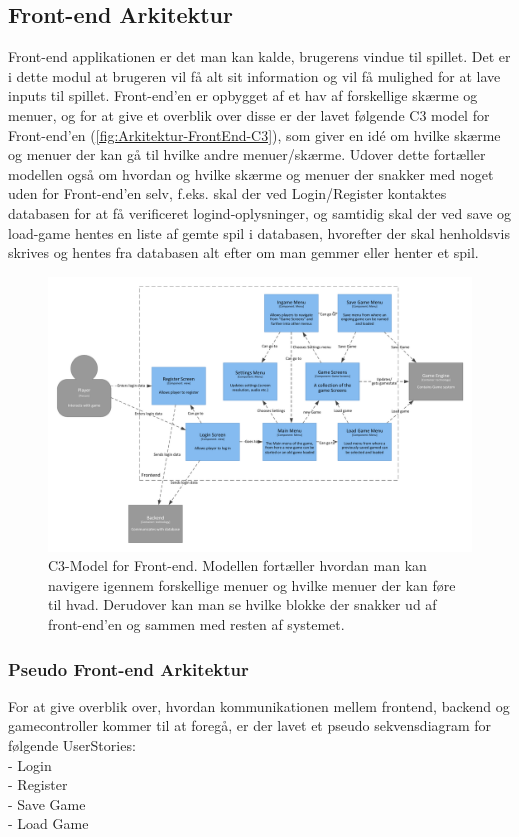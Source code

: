 \subsection{Front-end Arkitektur}

Front-end applikationen er det man kan kalde, brugerens vindue til spillet. Det er i dette modul at brugeren vil få alt sit information
og vil få mulighed for at lave inputs til spillet. 
Front-end'en er opbygget af et hav af forskellige skærme og menuer, og for at give et overblik over disse er der lavet følgende C3 model
for Front-end'en (\autoref{fig:Arkitektur-FrontEnd-C3}), som giver en idé om hvilke skærme og menuer der kan gå til hvilke andre menuer/skærme.
Udover dette fortæller modellen også om hvordan og hvilke skærme og menuer der snakker med noget uden for Front-end'en selv, f.eks. skal der
ved Login/Register kontaktes databasen for at få verificeret logind-oplysninger, og samtidig skal der ved save og load-game hentes en liste af
gemte spil i databasen, hvorefter der skal henholdsvis skrives og hentes fra databasen alt efter om man gemmer eller henter et spil.

\begin{figure}[H]
\centering
\includegraphics[width = \textwidth]{02-Body/Images/Frontend_C3.pdf}
\caption{C3-Model for Front-end. Modellen fortæller hvordan man kan navigere igennem forskellige menuer og hvilke menuer der kan føre til hvad. Derudover kan man se hvilke blokke der snakker ud af front-end'en og sammen med resten af systemet.}
\label{fig:Arkitektur-FrontEnd-C3}
\end{figure}

\subsubsection{Pseudo Front-end Arkitektur}
For at give overblik over, hvordan kommunikationen mellem frontend, backend og gamecontroller kommer til at foregå, er der lavet et pseudo sekvensdiagram for følgende UserStories:
\\
- Login\\
- Register\\
- Save Game\\
- Load Game\\

